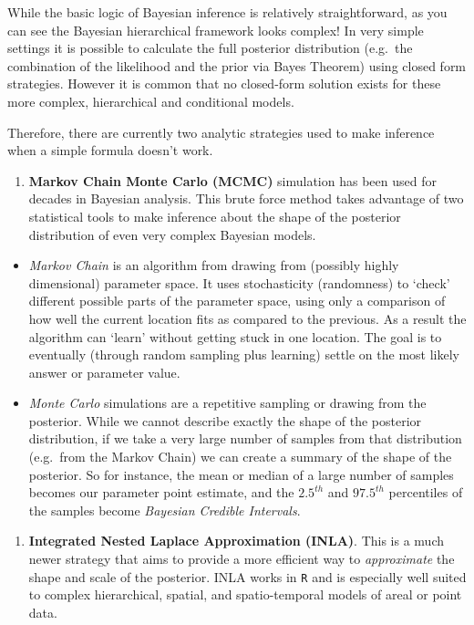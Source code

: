 \documentclass[
]{book}
\newcommand{\passthrough}[1]{#1}
\providecommand{\tightlist}{%
  \setlength{\itemsep}{0pt}\setlength{\parskip}{0pt}}
\begin{document}
While the basic logic of Bayesian inference is relatively straightforward, as you can see the Bayesian hierarchical framework looks complex! In very simple settings it is possible to calculate the full posterior distribution (e.g.~the combination of the likelihood and the prior via Bayes Theorem) using closed form strategies. However it is common that no closed-form solution exists for these more complex, hierarchical and conditional models.

Therefore, there are currently two analytic strategies used to make inference when a simple formula doesn't work.

\begin{enumerate}
\def\labelenumi{\arabic{enumi}.}
\tightlist
\item
  \textbf{Markov Chain Monte Carlo (MCMC)} simulation has been used for decades in Bayesian analysis. This brute force method takes advantage of two statistical tools to make inference about the shape of the posterior distribution of even very complex Bayesian models.
\end{enumerate}

\begin{itemize}
\tightlist
\item
  \emph{Markov Chain} is an algorithm from drawing from (possibly highly dimensional) parameter space. It uses stochasticity (randomness) to `check' different possible parts of the parameter space, using only a comparison of how well the current location fits as compared to the previous. As a result the algorithm can `learn' without getting stuck in one location. The goal is to eventually (through random sampling plus learning) settle on the most likely answer or parameter value.
\item
  \emph{Monte Carlo} simulations are a repetitive sampling or drawing from the posterior. While we cannot describe exactly the shape of the posterior distribution, if we take a very large number of samples from that distribution (e.g.~from the Markov Chain) we can create a summary of the shape of the posterior. So for instance, the mean or median of a large number of samples becomes our parameter point estimate, and the \(2.5^{th}\) and \(97.5^{th}\) percentiles of the samples become \emph{Bayesian Credible Intervals}.
\end{itemize}

\begin{enumerate}
\def\labelenumi{\arabic{enumi}.}
\setcounter{enumi}{1}
\tightlist
\item
  \textbf{Integrated Nested Laplace Approximation (INLA)}. This is a much newer strategy that aims to provide a more efficient way to \emph{approximate} the shape and scale of the posterior. INLA works in \passthrough{\lstinline!R!} and is especially well suited to complex hierarchical, spatial, and spatio-temporal models of areal or point data.
\end{enumerate}
\end{document}

